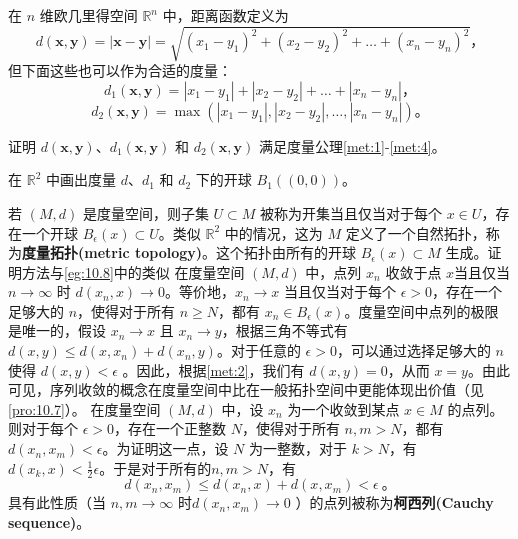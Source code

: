 \begin{theorem}
\begin{theorem}
在 $n$ 维欧几里得空间 $\mathbb{R}^{n}$ 中，距离函数定义为
\begin{equation*}
    d(\mathbf{x} ,\mathbf{y} )=|\mathbf{x} -\mathbf{y} |=\sqrt{(x_{1} -y_{1} )^{2} +(x_{2} -y_{2} )^{2} +\dotsc +(x_{n} -y_{n} )^{2}} ，
\end{equation*}
但下面这些也可以作为合适的度量：
\begin{equation*}
    d_{1} (\mathbf{x} ,\mathbf{y} )=|x_{1} -y_{1} |+|x_{2} -y_{2} |+\dotsc +|x_{n} -y_{n} |，
\end{equation*}
\begin{equation*}
    d_{2} (\mathbf{x} ,\mathbf{y} )=\max (|x_{1} -y_{1} |,|x_{2} -y_{2} |,\dotsc ,|x_{n} -y_{n} |)。
\end{equation*}

\begin{exercise}
	证明 $d(\mathbf{x} ,\mathbf{y} )$、$d_{1} (\mathbf{x} ,\mathbf{y} )$ 和 $d_{2} (\mathbf{x} ,\mathbf{y} )$ 满足度量公理\ref{met:1}-\ref{met:4}。
\end{exercise}

\begin{exercise}
	在 $\mathbb{R}^{2}$ 中画出度量 $d$、$d_{1}$ 和 $d_{2}$ 下的开球 $B_{1} ((0,0))$。
\end{exercise}

	若 $(M,d)$ 是度量空间，则子集 $U\subset M$ 被称为开集当且仅当对于每个 $x\in U$，存在一个开球 $B_{\epsilon } (x)\subset U$。类似 $\mathbb{R}^{2}$ 中的情况，这为 $M$ 定义了一个自然拓扑，称为\textbf{度量拓扑(metric topology)}。这个拓扑由所有的开球 $B_{\epsilon } (x)\subset M$ 生成。证明方法与\ref{eg:10.8}中的类似
	在度量空间 $(M,d)$ 中，点列 $x_{n}$ 收敛于点 $x$当且仅当$n\rightarrow \infty $ 时 $d(x_{n} ,x)\rightarrow 0$。等价地，$x_{n}\rightarrow x$ 当且仅当对于每个 $\epsilon  >0$，存在一个足够大的 $n$，使得对于所有 $n\geq N$，都有 $x_{n} \in B_{\epsilon } (x)$。度量空间中点列的极限是唯一的，假设 $x_{n}\rightarrow x$ 且 $x_{n}\rightarrow y$，根据三角不等式有 $d(x,y)\leq d(x,x_{n} )+d(x_{n} ,y)$。对于任意的 $\epsilon  >0$，可以通过选择足够大的 $n$ 使得 $d(x,y)< \epsilon $ 。因此，根据\ref{met:2}，我们有 $d(x,y)=0$，从而 $x=y$。由此可见，序列收敛的概念在度量空间中比在一般拓扑空间中更能体现出价值（见\ref{pro:10.7}）。
	在度量空间 $(M,d)$ 中，设 $x_{n}$ 为一个收敛到某点 $x\in M$ 的点列。则对于每个 $\epsilon  >0$，存在一个正整数 $N$，使得对于所有 $n,m >N$，都有 $d(x_{n} ,x_{m} )< \epsilon $。为证明这一点，设 $N$ 为一整数，对于 $k >N$，有 $d(x_{k} ,x)< \frac{1}{2} \epsilon $。于是对于所有的$n,m >N$，有
\begin{equation*}
    d(x_{n} ,x_{m} )\leq d(x_{n} ,x)+d(x,x_{m} )< \epsilon \ 。
\end{equation*}
具有此性质（当 $n,m\rightarrow \infty $ 时$d(x_{n} ,x_{m} )\rightarrow 0$ ）的点列被称为\textbf{柯西列(Cauchy sequence)}。


\end{theorem}
\end{theorem}
